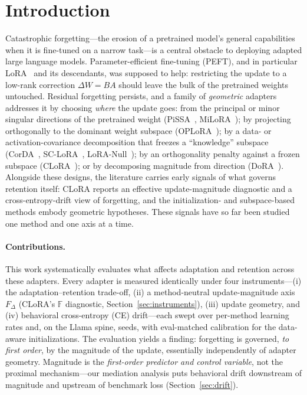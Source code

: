 \documentclass[11pt]{article}
\newcommand{\dw}{F_{\Delta}}
\begin{document}
\section{Introduction}\label{sec:intro}
Catastrophic forgetting---the erosion of a pretrained model's general
capabilities when it is fine-tuned on a narrow task---is a central obstacle to
deploying adapted large language models. Parameter-efficient fine-tuning (PEFT),
and in particular LoRA~\citep{hu2021lora} and its descendants, was supposed to
help: restricting the update to a low-rank correction $\Delta W = BA$ should leave
the bulk of the pretrained weights untouched. Residual forgetting persists, and a
family of \emph{geometric} adapters addresses it by choosing \emph{where} the
update goes: from the principal or minor singular directions of the pretrained
weight (PiSSA~\citep{meng2024pissa}, MiLoRA~\citep{wang2024milora}); by projecting
orthogonally to the dominant weight subspace (OPLoRA~\citep{xiong2025oplora}); by a
data- or activation-covariance decomposition that freezes a ``knowledge'' subspace
(CorDA~\citep{yang2024corda}, SC-LoRA~\citep{luo2025sclora},
LoRA-Null~\citep{tang2025loranull}); by an orthogonality penalty against a frozen
subspace (CLoRA~\citep{clora}); or by decomposing magnitude from direction
(DoRA~\citep{liu2024dora}). Alongside these designs, the literature carries
early signals of what governs retention itself: CLoRA reports an effective
update-magnitude diagnostic and a cross-entropy-drift view of forgetting, and
the initialization- and subspace-based methods embody geometric hypotheses.
These signals have so far been studied one method and one axis at a time.

\paragraph{Contributions.} This work systematically evaluates what affects
adaptation and retention across these adapters. Every adapter is measured
identically under four instruments---(i) the adaptation--retention trade-off,
(ii) a method-neutral update-magnitude axis $\dw$ (CLoRA's $\mathbb{F}$
diagnostic, Section~\ref{sec:instruments}), (iii) update geometry, and (iv)
behavioral cross-entropy (CE) drift---each swept over per-method learning rates
and, on the Llama spine, seeds, with eval-matched calibration for the data-aware
initializations. The evaluation yields a finding: forgetting is governed,
\emph{to first order}, by the magnitude of the update, essentially independently
of adapter geometry. Magnitude is the \emph{first-order predictor and control
variable}, not the proximal mechanism---our mediation analysis puts behavioral
drift downstream of magnitude and upstream of benchmark loss
(Section~\ref{sec:drift}).
\end{document}
